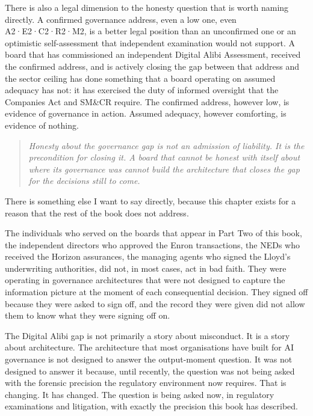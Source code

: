 There is also a legal dimension to the honesty question that is worth naming directly. A confirmed governance address, even a low one, even A2·E2·C2·R2·M2, is a better legal position than an unconfirmed one or an optimistic self-assessment that independent examination would not support. A board that has commissioned an independent Digital Alibi Assessment, received the confirmed address, and is actively closing the gap between that address and the sector ceiling has done something that a board operating on assumed adequacy has not: it has exercised the duty of informed oversight that the Companies Act and SM\&CR require. The confirmed address, however low, is evidence of governance in action. Assumed adequacy, however comforting, is evidence of nothing.

\begin{quote}
\emph{Honesty about the governance gap is not an admission of liability. It is the precondition for closing it. A board that cannot be honest with itself about where its governance was cannot build the architecture that closes the gap for the decisions still to come.}
\end{quote}

There is something else I want to say directly, because this chapter exists for a reason that the rest of the book does not address.

The individuals who served on the boards that appear in Part Two of this book, the independent directors who approved the Enron transactions, the NEDs who received the Horizon assurances, the managing agents who signed the Lloyd's underwriting authorities, did not, in most cases, act in bad faith. They were operating in governance architectures that were not designed to capture the information picture at the moment of each consequential decision. They signed off because they were asked to sign off, and the record they were given did not allow them to know what they were signing off on.

The Digital Alibi gap is not primarily a story about misconduct. It is a story about architecture. The architecture that most organisations have built for AI governance is not designed to answer the output-moment question. It was not designed to answer it because, until recently, the question was not being asked with the forensic precision the regulatory environment now requires. That is changing. It has changed. The question is being asked now, in regulatory examinations and litigation, with exactly the precision this book has described.

